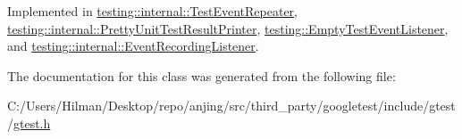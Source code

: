 Implemented in \hyperlink{classtesting_1_1internal_1_1_test_event_repeater_a70d694ca5010cc86cd458f7f529e6fbe}{testing\+::internal\+::\+Test\+Event\+Repeater}, \hyperlink{classtesting_1_1internal_1_1_pretty_unit_test_result_printer_a5078ee71cfa97e37ae7a9366149195c5}{testing\+::internal\+::\+Pretty\+Unit\+Test\+Result\+Printer}, \hyperlink{classtesting_1_1_empty_test_event_listener_a84fa74cc9ba742f9f847ea405ca84e5e}{testing\+::\+Empty\+Test\+Event\+Listener}, and \hyperlink{classtesting_1_1internal_1_1_event_recording_listener_aebd488b780fc172d6058ca07ca8f7145}{testing\+::internal\+::\+Event\+Recording\+Listener}.



The documentation for this class was generated from the following file\+:\begin{DoxyCompactItemize}
\item 
C\+:/\+Users/\+Hilman/\+Desktop/repo/anjing/src/third\+\_\+party/googletest/include/gtest/\hyperlink{gtest_8h}{gtest.\+h}\end{DoxyCompactItemize}
